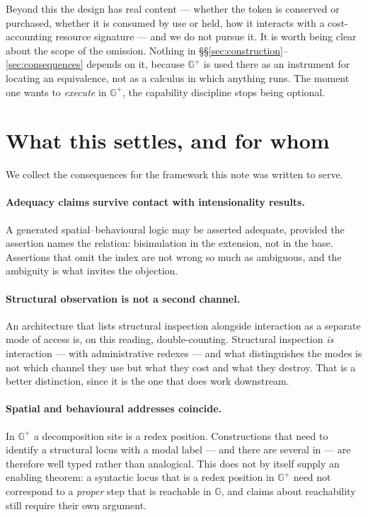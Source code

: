 \documentclass[11pt]{article}
\theoremstyle{plain}
\theoremstyle{definition}
\newcommand{\Gg}{\mathbb{G}}
\begin{document}
Beyond this the design has real content --- whether the token is conserved or purchased, whether it is
consumed by use or held, how it interacts with a cost-accounting resource signature --- and we do not
pursue it. It is worth being clear about the scope of the omission. Nothing in
\S\S\ref{sec:construction}--\ref{sec:consequences} depends on it, because $\Gg^+$ is used there as an
instrument for locating an equivalence, not as a calculus in which anything runs. The moment one wants
to \emph{execute} in $\Gg^+$, the capability discipline stops being optional.

\section{What this settles, and for whom}
\label{sec:settles}

We collect the consequences for the framework this note was written to serve.

\paragraph{Adequacy claims survive contact with intensionality results.} A generated spatial--behavioural
logic may be asserted adequate, provided the assertion names the relation: bisimulation in the
extension, not in the base. Assertions that omit the index are not wrong so much as ambiguous, and the
ambiguity is what invites the objection.

\paragraph{Structural observation is not a second channel.} An architecture that lists structural
inspection alongside interaction as a separate mode of access is, on this reading, double-counting.
Structural inspection \emph{is} interaction --- with administrative redexes --- and what distinguishes
the modes is not which channel they use but what they cost and what they destroy. That is a better
distinction, since it is the one that does work downstream.

\paragraph{Spatial and behavioural addresses coincide.} In $\Gg^+$ a decomposition site is a redex
position. Constructions that need to identify a structural locus with a modal label --- and there are
several in \cite{ScientistNote} --- are therefore well typed rather than analogical. This does not by
itself supply an enabling theorem: a syntactic locus that is a redex position in $\Gg^+$ need not
correspond to a \emph{proper} step that is reachable in $\Gg$, and claims about reachability still
require their own argument.
\end{document}
